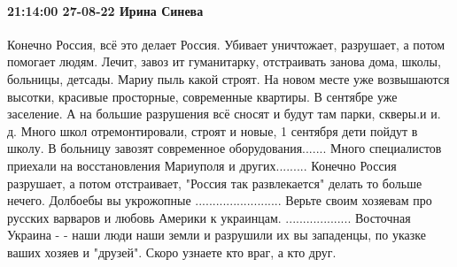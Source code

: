  
 
 
 
 

\paragraph{21:14:00 27-08-22 Ирина Синева}

Конечно Россия, всё это делает Россия. Убивает уничтожает, разрушает, а потом
помогает людям. Лечит, завоз ит гуманитарку, отстраивать занова дома, школы,
больницы, детсады. Мариу пыль какой строят. На новом месте уже возвышаются
высотки, красивые просторные, современные квартиры. В сентябре уже заселение. А
на большие разрушения всё сносят и будут там парки, скверы.и и. д. Много школ
отремонтировали, строят и новые, 1 сентября дети пойдут в школу. В больницу
завозят современное оборудования....... Много специалистов приехали на
восстановления Мариуполя и других......... Конечно Россия разрушает, а потом
отстраивает, "Россия так развлекается" делать то больше нечего. Долбоебы вы
укрожопные ......................... Верьте своим хозяевам про русских варваров
и любовь Америки к украинцам.  ................... Восточная Украина - - наши
люди наши земли и разрушили их вы западенцы, по указке ваших хозяев и "друзей".
Скоро узнаете кто враг, а кто друг.
